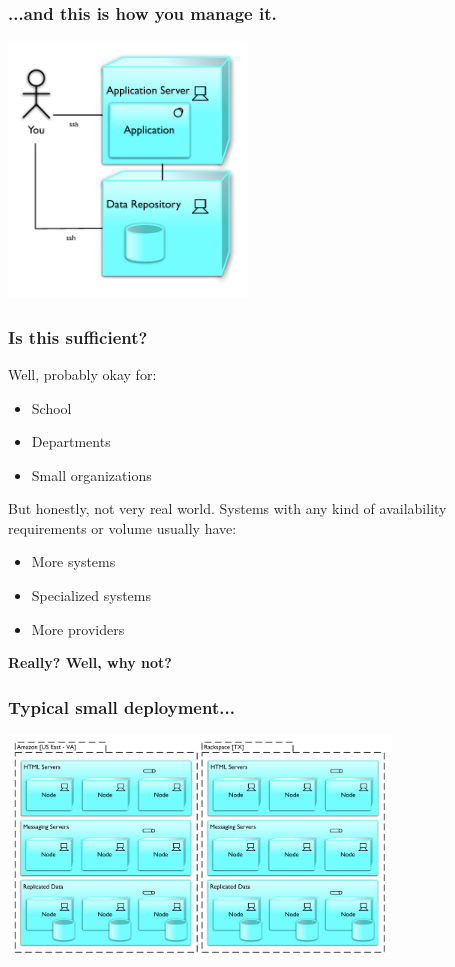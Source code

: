 \documentclass[t,handout]{beamer}
\begin{document}
\begin{frame}
\frametitle{...and this is how you manage it.}
\begin{center}
\includegraphics[width = 2.5in]{cap-stack-you.pdf}
\end{center}
\transfade
\end{frame}

\begin{frame}
\frametitle{Is this sufficient?}
Well, probably okay for:
\begin{small}
\begin{itemize}
\item School
\item Departments
\item Small organizations
\end{itemize}
\end{small}
But honestly, not very real world.  Systems with any kind of availability requirements or volume usually have:
\begin{small}
\begin{itemize}
\item More systems
\item Specialized systems
\item More providers
\end{itemize}
\end{small}
\begin{center}
{\bf Really? Well, why not?}
\end{center}
\end{frame}

\begin{frame}
\frametitle{Typical small deployment...}
\begin{center}
\includegraphics[width = 4in]{cap-distributed.pdf}
\end{center}
\transfade
\end{frame}
\end{document}

